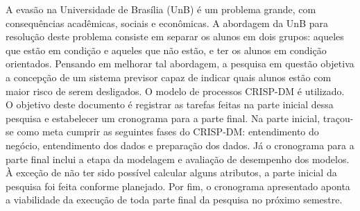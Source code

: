 A evasão na Universidade de Brasília (UnB) é um problema grande, com consequências
acadêmicas, sociais e econômicas. A abordagem da UnB para resolução deste problema
consiste em separar os alunos em dois grupos: aqueles que estão em condição e
aqueles que não estão, e ter os alunos em condição orientados. Pensando em melhorar
tal abordagem, a pesquisa em questão objetiva a concepção de um sistema previsor
capaz de indicar quais alunos estão com maior risco de serem desligados. 
O modelo de processos CRISP-DM é utilizado. 
O objetivo deste documento é registrar as tarefas feitas na parte inicial dessa
pesquisa e estabelecer um cronograma para a parte final. Na parte inicial,
traçou-se como meta cumprir as seguintes fases do CRISP-DM: entendimento do negócio,
entendimento dos dados e preparação dos dados. Já o cronograma para a parte final
inclui a etapa da modelagem e avaliação de desempenho dos modelos.
À exceção de não ter sido possível calcular alguns atributos, a parte inicial da
pesquisa foi feita conforme planejado. Por fim, o cronograma apresentado aponta a
viabilidade da execução de toda parte final da pesquisa no próximo semestre.  

